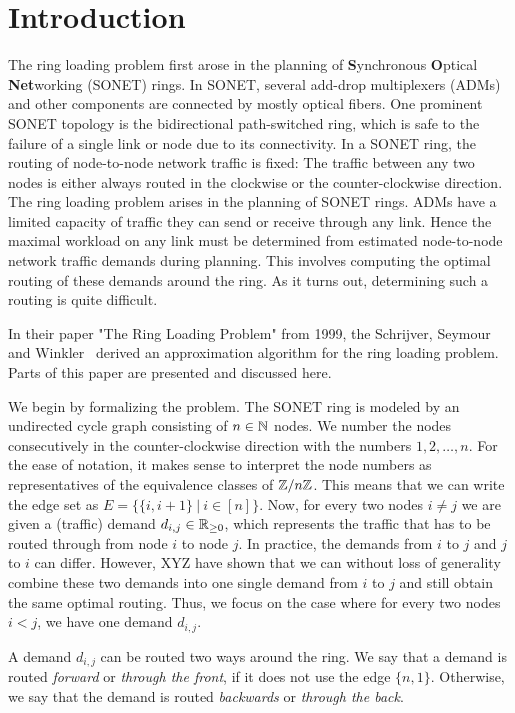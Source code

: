 \section{Introduction}

The ring loading problem first arose in the planning of \textbf{S}ynchronous \textbf{O}ptical \textbf{Net}working (SONET) rings.
In SONET, several add-drop multiplexers (ADMs) and other components are connected by mostly optical fibers.
One prominent SONET topology is the bidirectional path-switched ring, which is safe to the failure of a single link or node due to its connectivity.
In a SONET ring, the routing of node-to-node network traffic is fixed: The traffic between any two nodes is either always routed in the clockwise or the counter-clockwise direction.
The ring loading problem arises in the planning of SONET rings.
ADMs have a limited capacity of traffic they can send or receive through any link.
Hence the maximal workload on any link must be determined from estimated node-to-node network traffic demands during planning.
This involves computing the optimal routing of these demands around the ring.
As it turns out, determining such a routing is quite difficult.

In their paper "The Ring Loading Problem" from 1999, the Schrijver, Seymour and Winkler~\cite{schrijver99} derived an approximation algorithm for the ring loading problem.
Parts of this paper are presented and discussed here.

We begin by formalizing the problem.
The SONET ring is modeled by an undirected cycle graph consisting of $n \in \mathbb{N}$ nodes.
We number the nodes consecutively in the counter-clockwise direction with the numbers $1, 2, \dots, n$.
For the ease of notation, it makes sense to interpret the node numbers as representatives of the equivalence classes of $\mathbb{Z}/n\mathbb{Z}$.
This means that we can write the edge set as $E = \{\{i, i+1\}\ |\ i \in [n]\}$.
Now, for every two nodes $i \neq j$ we are given a (traffic) demand $d_{i, j} \in \mathbb{R}_{\geq 0}$, which represents the traffic that has to be routed through from node $i$ to node $j$.
In practice, the demands from $i$ to $j$ and $j$ to $i$ can differ.
However, XYZ have shown that we can without loss of generality combine these two demands into one single demand from $i$ to $j$ and still obtain the same optimal routing.
Thus, we focus on the case where for every two nodes $i < j$, we have one demand $d_{i,j}$.

A demand $d_{i, j}$ can be routed two ways around the ring.
We say that a demand is routed \emph{forward} or \emph{through the front}, if it does not use the edge $\{n, 1\}$.
Otherwise, we say that the demand is routed \emph{backwards} or \emph{through the back}.

